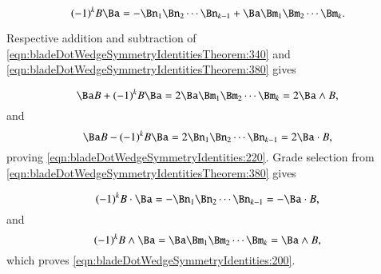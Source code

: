 \begin{dmath}\label{eqn:bladeDotWedgeSymmetryIdentitiesTheorem:380}
(-1)^k B \Ba
=
- \Bn_1 \Bn_2 \cdots \Bn_{k-1} + \Ba \Bm_1 \Bm_2 \cdots \Bm_k.
\end{dmath}

Respective addition and subtraction of \cref{eqn:bladeDotWedgeSymmetryIdentitiesTheorem:340} and \cref{eqn:bladeDotWedgeSymmetryIdentitiesTheorem:380} gives

\begin{dmath}\label{eqn:bladeDotWedgeSymmetryIdentitiesTheorem:400}
\Ba B + (-1)^k B \Ba
= 2 \Ba \Bm_1 \Bm_2 \cdots \Bm_k
= 2 \Ba \wedge B,
\end{dmath}
and
\begin{dmath}\label{eqn:bladeDotWedgeSymmetryIdentitiesTheorem:420}
\Ba B - (-1)^k B \Ba
=
2
\Bn_1 \Bn_2 \cdots \Bn_{k-1}
= 2 \Ba \cdot B,
\end{dmath}
proving \cref{eqn:bladeDotWedgeSymmetryIdentities:220}.  Grade selection from \cref{eqn:bladeDotWedgeSymmetryIdentitiesTheorem:380} gives

\begin{dmath}\label{eqn:bladeDotWedgeSymmetryIdentitiesTheorem:440}
(-1)^k B \cdot \Ba
=
- \Bn_1 \Bn_2 \cdots \Bn_{k-1}
= - \Ba \cdot B,
\end{dmath}
and
\begin{dmath}\label{eqn:bladeDotWedgeSymmetryIdentitiesTheorem:460}
(-1)^k B \wedge \Ba
=
\Ba \Bm_1 \Bm_2 \cdots \Bm_k
= \Ba \wedge B,
\end{dmath}
which proves \cref{eqn:bladeDotWedgeSymmetryIdentities:200}.

